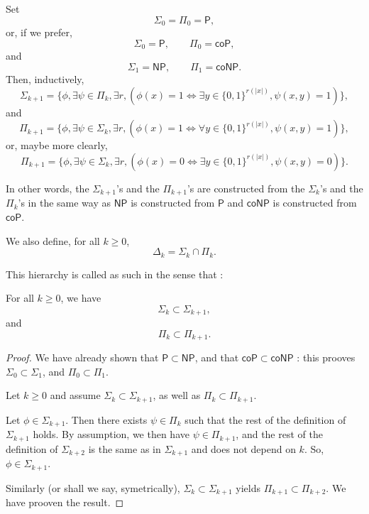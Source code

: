\begin{definition}
    Set
    \[
        \mathsf \Sigma_0 = \mathsf \Pi_0 = \mathsf P,
    \]
    or, if we prefer,
    \[
        \mathsf \Sigma_0 = \mathsf P, \qquad \mathsf \Pi_0 = \mathsf{coP},
    \]
    and
    \[
        \mathsf \Sigma_1 = \mathsf{NP}, \qquad \mathsf \Pi_1 = \mathsf{coNP}.
    \]
    Then, inductively,
    \[
        \mathsf \Sigma_{k+1} = \{ \phi, \exists \psi \in \mathsf \Pi_k, \exists r, (\phi(x) = 1 \iff \exists y \in \{ 0,1 \}^{r(|x|)}, \psi(x,y) = 1) \},
    \]
    and
    \[
        \mathsf \Pi_{k+1} = \{ \phi, \exists \psi \in \mathsf \Sigma_k, \exists r, (\phi(x) = 1 \iff \forall y \in \{ 0,1 \}^{r(|x|)}, \psi(x,y) = 1) \},
    \]
    or, maybe more clearly,
    \[
        \mathsf \Pi_{k+1} = \{ \phi, \exists \psi \in \mathsf \Sigma_k, \exists r, (\phi(x) = 0 \iff \exists y \in \{ 0,1 \}^{r(|x|)}, \psi(x,y) = 0) \}.
    \]
\end{definition}

In other words, the $ \mathsf \Sigma_{k+1} $'s and the $ \mathsf \Pi_{k+1} $'s are constructed from the $ \mathsf \Sigma_k $'s and the $ \mathsf \Pi_k $'s in the same way as $ \mathsf{NP} $ is constructed from $ \mathsf P $ and $ \mathsf{coNP} $ is constructed from $ \mathsf{coP} $.

\begin{definition}
    We also define, for all $ k \ge 0 $,
    \[
        \Delta_k = \mathsf \Sigma_k \cap \mathsf \Pi_k.
    \]
\end{definition}

This \og hierarchy \fg is called as such in the sense that :

\begin{proposition}
    For all $ k \ge 0 $, we have
    \[
        \mathsf \Sigma_k \subset \mathsf \Sigma_{k+1},
    \]
    and
    \[
        \mathsf \Pi_k \subset \mathsf \Pi_{k+1}.
    \]
\end{proposition}

\begin{proof}
    We have already shown that $ \mathsf P \subset \mathsf{NP} $, and that $ \mathsf{coP} \subset \mathsf{coNP} $ : this prooves $ \mathsf \Sigma_0 \subset \mathsf \Sigma_1 $, and $ \mathsf \Pi_0 \subset \mathsf \Pi_1 $.

    Let $ k \ge 0 $ and assume $ \mathsf \Sigma_k \subset \mathsf \Sigma_{k+1} $, as well as $ \mathsf \Pi_k \subset \mathsf \Pi_{k+1} $.

    Let $ \phi \in \mathsf \Sigma_{k+1} $. Then there exists $ \psi \in \mathsf \Pi_k $ such that the rest of the definition of $ \mathsf \Sigma_{k+1} $ holds. By assumption, we then have $ \psi \in \mathsf \Pi_{k+1} $, and the rest of the definition of $ \mathsf \Sigma_{k+2} $ is the same as in $ \mathsf \Sigma_{k+1} $ and does not depend on $ k $. So, $ \phi \in \mathsf \Sigma_{k+1} $.

    Similarly (or shall we say, symetrically), $ \mathsf \Sigma_k \subset \mathsf \Sigma_{k+1} $ yields $ \mathsf \Pi_{k+1} \subset \mathsf \Pi_{k+2} $. We have prooven the result.
\end{proof}

